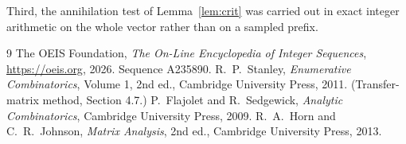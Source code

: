 \documentclass[11pt,a4paper]{article}
\theoremstyle{plain}
\theoremstyle{definition}
\begin{document}
Third, the annihilation test of Lemma~\ref{lem:crit} was carried out in exact integer
arithmetic on the whole vector rather than on a sampled prefix.

\begin{thebibliography}{9}
 The OEIS Foundation, \emph{The On-Line Encyclopedia of Integer
Sequences}, \url{https://oeis.org}, 2026. Sequence A235890.
 R.~P.~Stanley, \emph{Enumerative Combinatorics}, Volume 1, 2nd ed.,
Cambridge University Press, 2011. (Transfer-matrix method, Section 4.7.)
 P.~Flajolet and R.~Sedgewick, \emph{Analytic Combinatorics}, Cambridge
University Press, 2009.
 R.~A.~Horn and C.~R.~Johnson, \emph{Matrix Analysis}, 2nd ed., Cambridge
University Press, 2013.
\end{thebibliography}
\end{document}
